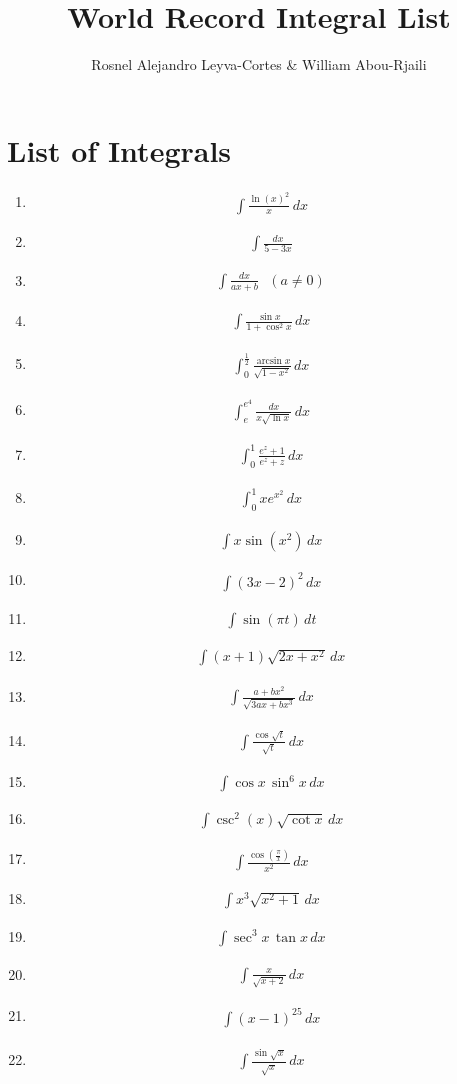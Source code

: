 \documentclass[twoside, fleqn,12pt,letterpaper]{book}
\title{\textbf{World Record Integral List}}
\author{Rosnel Alejandro Leyva-Cortes \& William Abou-Rjaili}
\newcommand{\makeitem}[2]{\item {#2}\begin{align*} {#1}
  \end{align*}}
\newcommand{\makeitemtextb}[1]{\makeitem{{#1}}{\cite{RosTextbook}}}
\begin{document}
\maketitle

\section*{List of Integrals}
\begin{multicols}{2}
\begin{enumerate}

  \makeitemtextb {\int\frac{\ln(x)^2}{x}\,dx}
  
  \makeitemtextb { \int\frac{dx}{5-3x}}
  
 \makeitemtextb{\int\frac{dx}{ax+b}\,\,\,\, (a \neq 0)}
  
  \makeitemtextb{\int\frac{\sin x}{1+\cos^2 x} \, dx}
  
  \makeitemtextb{\int_{0}^{\frac{1}{2}}\frac{\arcsin x}{\sqrt{1-x^2}} \, dx}
  
  \makeitemtextb{\int_{e}^{e^4}\frac{dx}{x\sqrt{\ln x}} \, dx}
  
  \makeitemtextb{\int_{0}^{1}\frac{e^z+1}{e^z+z} \, dx}
  
  \makeitemtextb{\int_{0}^{1}xe^{x^2} \, dx}
  
  \makeitemtextb{\int x\sin(x^2) \, dx}
  
  \makeitemtextb{\int (3x-2)^2 \, dx}
  
  \makeitemtextb{\int \sin(\pi t) \, dt}
  
  \makeitemtextb{\int (x+1)\sqrt{2x+x^2} \, dx}
  
  \makeitemtextb{\int\frac{a+bx^2}{\sqrt{3ax+bx^3}} \, dx}
  
  \makeitemtextb{\int\frac{\cos\sqrt{t}}{\sqrt{t}}\, dx}
  
 \makeitemtextb{\int \cos x \, \sin^6 x \, dx}
  
  \makeitemtextb{\int \csc^2(x)\sqrt{\cot x} \, dx}
  
 \makeitemtextb{\int\frac{\cos\left(\frac{\pi}{x}\right)}{x^2} \, dx}
  
  \makeitemtextb{\int x^3\sqrt{x^2+1} \, dx}
  
  \makeitemtextb{\int \sec^3 x\,\tan x \, dx}
  
  \makeitemtextb{\int\frac{x}{\sqrt{x+2}} \, dx}
  
  \makeitemtextb{ \int (x-1)^{25} \, dx} %
  
  \makeitemtextb{\int\frac{\sin\sqrt{x}}{\sqrt{x}} \, dx}
  

\end{enumerate}
\end{multicols}
\end{document}

